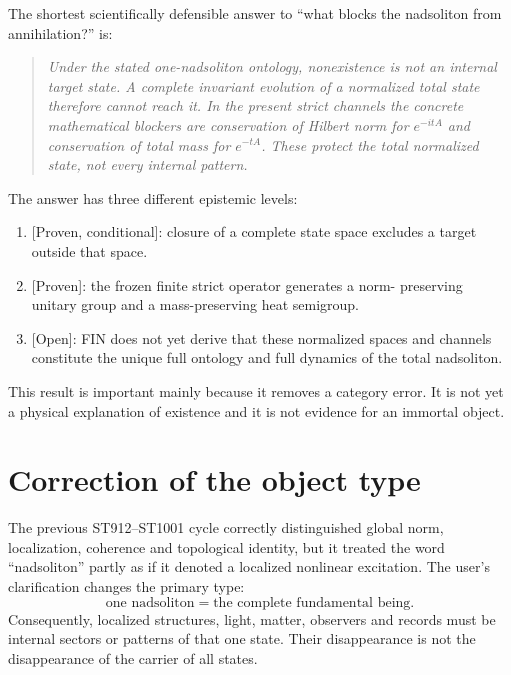 \documentclass[11pt,a4paper]{article}
\newcommand{\status}[1]{\textsf{[#1]}}
\begin{document}
The shortest scientifically defensible answer to ``what blocks the
nadsoliton from annihilation?'' is:
\begin{quote}
\emph{Under the stated one-nadsoliton ontology, nonexistence is not an
internal target state.  A complete invariant evolution of a normalized total
state therefore cannot reach it.  In the present strict channels the concrete
mathematical blockers are conservation of Hilbert norm for $e^{-itA}$ and
conservation of total mass for $e^{-tA}$.  These protect the total normalized
state, not every internal pattern.}
\end{quote}

The answer has three different epistemic levels:
\begin{enumerate}[label=\textbf{E\arabic*.}]
\item \status{Proven, conditional}: closure of a complete state space excludes
      a target outside that space.
\item \status{Proven}: the frozen finite strict operator generates a norm-
      preserving unitary group and a mass-preserving heat semigroup.
\item \status{Open}: FIN does not yet derive that these normalized spaces and
      channels constitute the unique full ontology and full dynamics of the
      total nadsoliton.
\end{enumerate}

This result is important mainly because it removes a category error.  It is
not yet a physical explanation of existence and it is not evidence for an
immortal object.

\section{Correction of the object type}

The previous ST912--ST1001 cycle correctly distinguished global norm,
localization, coherence and topological identity, but it treated the word
``nadsoliton'' partly as if it denoted a localized nonlinear excitation.  The
user's clarification changes the primary type:
\[
  \boxed{\text{one nadsoliton}=\text{the complete fundamental being}.}
\]
Consequently, localized structures, light, matter, observers and records must
be internal sectors or patterns of that one state.  Their disappearance is not
the disappearance of the carrier of all states.
\end{document}
